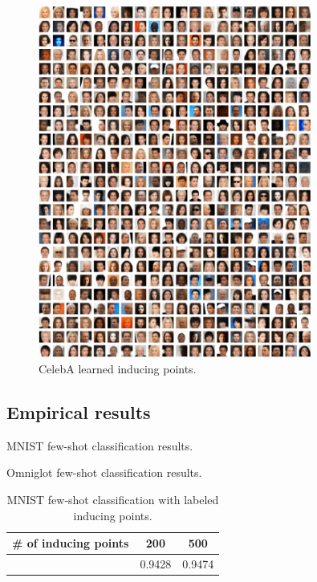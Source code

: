 \begin{figure}[h]
\centering
\includegraphics[width=0.8\textwidth]{img/loracs/celeba/inducing-points.png}
\caption{CelebA learned inducing points.}
\label{fig:celeba-inducing-points}
\end{figure}

\begin{landscape}
\section{Empirical results}
\thispagestyle{empty}

\begin{table}
\scriptsize
\centering
\setlength{\tabcolsep}{2pt}

\caption{MNIST few-shot classification results.}
\label{tab:semisupervised-mnist}
\end{table}

\begin{table}
\scriptsize
\setlength{\tabcolsep}{2pt}
\centering

\caption{Omniglot few-shot classification results.}
\label{tab:semisupervised-omniglot}
\end{table}
\begin{table}
\scriptsize
\setlength{\tabcolsep}{2pt}
\begin{tabular}{r|cc}
\toprule
     \# of inducing points &  200 & 500\\
\midrule
        & 0.9428 & 0.9474\\
\bottomrule
\end{tabular}
\centering
\caption{MNIST few-shot classification with labeled inducing points.}
\label{tab:inducing-point-labels}
\end{table}
\end{landscape}

